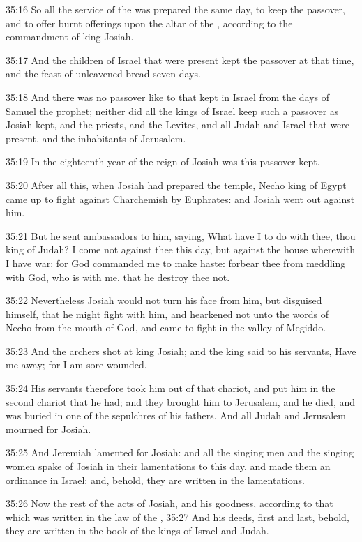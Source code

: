 35:16 So all the service of the \LORD was prepared the same day, to keep the passover, and to offer burnt offerings upon the altar of the \LORD, according to the commandment of king Josiah.

35:17 And the children of Israel that were present kept the passover at that time, and the feast of unleavened bread seven days.

35:18 And there was no passover like to that kept in Israel from the days of Samuel the prophet; neither did all the kings of Israel keep such a passover as Josiah kept, and the priests, and the Levites, and all Judah and Israel that were present, and the inhabitants of Jerusalem.

35:19 In the eighteenth year of the reign of Josiah was this passover kept.

35:20 After all this, when Josiah had prepared the temple, Necho king of Egypt came up to fight against Charchemish by Euphrates: and Josiah went out against him.

35:21 But he sent ambassadors to him, saying, What have I to do with thee, thou king of Judah? I come not against thee this day, but against the house wherewith I have war: for God commanded me to make haste: forbear thee from meddling with God, who is with me, that he destroy thee not.

35:22 Nevertheless Josiah would not turn his face from him, but disguised himself, that he might fight with him, and hearkened not unto the words of Necho from the mouth of God, and came to fight in the valley of Megiddo.

35:23 And the archers shot at king Josiah; and the king said to his servants, Have me away; for I am sore wounded.

35:24 His servants therefore took him out of that chariot, and put him in the second chariot that he had; and they brought him to Jerusalem, and he died, and was buried in one of the sepulchres of his fathers.  And all Judah and Jerusalem mourned for Josiah.

35:25 And Jeremiah lamented for Josiah: and all the singing men and the singing women spake of Josiah in their lamentations to this day, and made them an ordinance in Israel: and, behold, they are written in the lamentations.

35:26 Now the rest of the acts of Josiah, and his goodness, according to that which was written in the law of the \LORD, 35:27 And his deeds, first and last, behold, they are written in the book of the kings of Israel and Judah.

